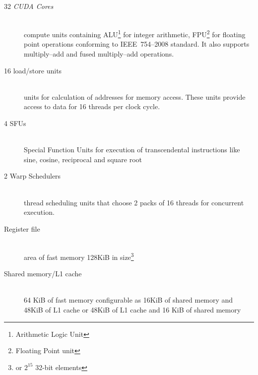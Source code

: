 \begin{description}
  \item[32 \emph{CUDA Cores}] \hfill \\
    compute units containing ALU\footnote{Arithmetic Logic Unit}
    for integer arithmetic, FPU\footnote{Floating Point unit} for floating point
    operations conforming to IEEE~754--2008 standard. It also supports multiply--add
    and fused multiply--add operations.
  \item[16 load/store units] \hfill \\
    units for calculation of addresses for memory access.
    These units provide access to data for 16 threads per clock cycle.
  \item[4 SFUs] \hfill \\
    Special Function Units for execution of transcendental instructions
    like sine, cosine, reciprocal and square root
  \item[2 Warp Schedulers] \hfill \\
    thread scheduling units that choose 2 packs of 16 threads for concurrent
    execution.
  \item[Register file] \hfill \\
    area of fast memory 128KiB in size\footnote{or $2^{15}$ 32-bit elements}
  \item[Shared memory/L1 cache] \hfill \\
    64 KiB of fast memory configurable as
    16KiB of shared memory and 48KiB of L1 cache or 48KiB of L1 cache and 16 KiB
    of shared memory
\end{description}
